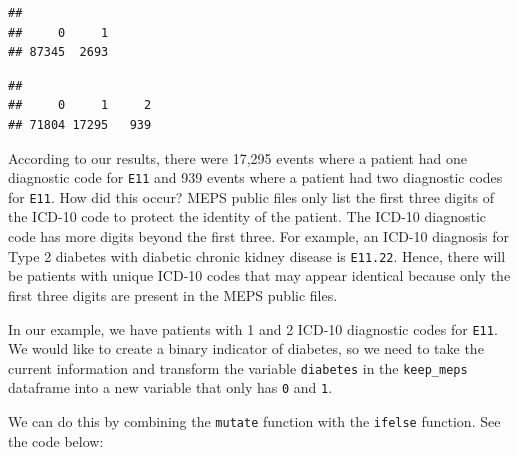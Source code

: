 \documentclass[
]{book}
\newenvironment{Shaded}{\begin{snugshade}}{\end{snugshade}}
\newcommand{\AttributeTok}[1]{\textcolor[rgb]{0.77,0.63,0.00}{#1}}
\newcommand{\ConstantTok}[1]{\textcolor[rgb]{0.00,0.00,0.00}{#1}}
\newcommand{\DocumentationTok}[1]{\textcolor[rgb]{0.56,0.35,0.01}{\textbf{\textit{#1}}}}
\newcommand{\FunctionTok}[1]{\textcolor[rgb]{0.00,0.00,0.00}{#1}}
\newcommand{\NormalTok}[1]{#1}
\newcommand{\OtherTok}[1]{\textcolor[rgb]{0.56,0.35,0.01}{#1}}
\newcommand{\SpecialCharTok}[1]{\textcolor[rgb]{0.00,0.00,0.00}{#1}}
\newcommand{\StringTok}[1]{\textcolor[rgb]{0.31,0.60,0.02}{#1}}
\theoremstyle{definition}
\theoremstyle{definition}
\theoremstyle{definition}
\theoremstyle{definition}
\theoremstyle{remark}
\begin{document}
\begin{verbatim}
## 
##     0     1 
## 87345  2693
\end{verbatim}

\begin{Shaded}
\end{Shaded}

\begin{verbatim}
## 
##     0     1     2 
## 71804 17295   939
\end{verbatim}

According to our results, there were 17,295 events where a patient had one diagnostic code for \texttt{E11} and 939 events where a patient had two diagnostic codes for \texttt{E11}. How did this occur? MEPS public files only list the first three digits of the ICD-10 code to protect the identity of the patient. The ICD-10 diagnostic code has more digits beyond the first three. For example, an ICD-10 diagnosis for Type 2 diabetes with diabetic chronic kidney disease is \texttt{E11.22}. Hence, there will be patients with unique ICD-10 codes that may appear identical because only the first three digits are present in the MEPS public files.

In our example, we have patients with 1 and 2 ICD-10 diagnostic codes for \texttt{E11}. We would like to create a binary indicator of diabetes, so we need to take the current information and transform the variable \texttt{diabetes} in the \texttt{keep\_meps} dataframe into a new variable that only has \texttt{0} and \texttt{1}.

We can do this by combining the \texttt{mutate} function with the \texttt{ifelse} function. See the code below:
\end{document}

